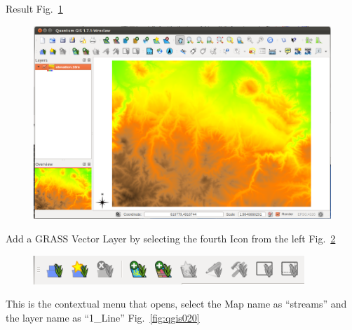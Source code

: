 Result Fig.~\ref{fig:qgis018}

\begin{figure}[htbp]
   \centering
   \includegraphics[scale=0.2]{qgis018.png}
   \caption{}
   \label{fig:qgis018}
\end{figure}

Add a GRASS Vector Layer by selecting the fourth Icon from the left Fig.~\ref{fig:qgis019}

\begin{figure}[htbp]
   \centering
   \includegraphics[scale=0.55]{qgis019.png}
   \caption{}
   \label{fig:qgis019}
\end{figure}

This is the contextual menu that opens, select the Map name as
``streams'' and the layer name as ``1\_Line'' Fig.~\ref{fig:qgis020}

